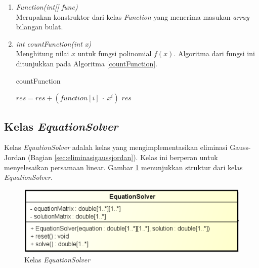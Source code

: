 \begin{enumerate}
	\item \textit{Function(int[] func)} \\
	Merupakan konstruktor dari kelas \textit{Function} yang menerima masukan \textit{array} bilangan bulat.
	\item \textit{int countFunction(int x)} \\
	Menghitung nilai \begin{math}x\end{math} untuk fungsi polinomial \begin{math}f(x)\end{math}. Algoritma dari fungsi ini ditunjukkan pada Algoritma \ref{countFunction}.
	\begin{algorithm}[H]
		\caption{countFunction}
		\label{countFunction}
		\begin{algorithmic}[1]
					\State \begin{math}res = res + (function[i]\: \cdot\: x^i)\end{math}
				\EndFor
				\State \Return \begin{math}res\end{math}
			\EndFunction
		\end{algorithmic}
	\end{algorithm}
\end{enumerate}

\subsection{Kelas \textit{EquationSolver}}

Kelas \textit{EquationSolver} adalah kelas yang mengimplementasikan eliminasi Gauss-Jordan (Bagian \ref{sec:eliminasigaussjordan}). Kelas ini berperan untuk menyelesaikan persamaan linear. Gambar \ref{fig:classequationsolver} menunjukkan struktur dari kelas \textit{EquationSolver}.

\begin{figure}[H]
	\centering
	\includegraphics[scale=0.7]{Gambar/class_equation_solver}
	\caption{Kelas \textit{EquationSolver}}\label{fig:classequationsolver}
\end{figure}

